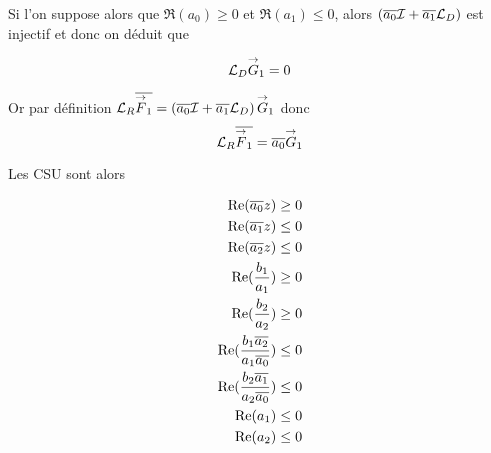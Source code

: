   Si l'on suppose alors que \(\Re(a_0) \ge 0 \) et \(\Re(a_1) \le 0\), alors \(\left(\conj{a_0} \oI + \conj{a_1} \LD \right)\) est injectif et donc on déduit que 

  \begin{equation}
    \LD\vG_1 = 0
  \end{equation}

  Or par définition \(\LR\conj{\vF_1} = \left(\conj{a_0} \oI + \conj{a_1} \LD \right)\vG_1\) donc
  \begin{equation}
    \LR\conj{\vF_1} = \conj{a_0}\vG_1
  \end{equation}

  Les CSU sont alors

  \begin{align}
    \Re(\conj{a_0}z) \ge 0 \\
    \Re(\conj{a_1}z) \le 0 \\
    \Re(\conj{a_2}z) \le 0 \\
    \Re(\frac{b_1}{a_1}) \ge 0 \\
    \Re(\frac{b_2}{a_2}) \ge 0 \\
    \Re(\frac{b_1\conj{a_2}}{a_1\conj{a_0}}) \le 0 \\
    \Re(\frac{b_2\conj{a_1}}{a_2\conj{a_0}}) \le 0 \\
    \Re(a_1) \le 0 \\
    \Re(a_2) \le 0
  \end{align}